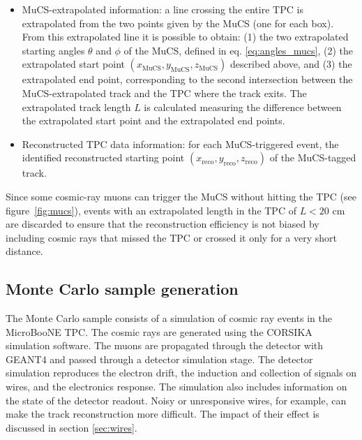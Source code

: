 \documentclass[a4paper,11pt]{article}
\begin{document}
\begin{itemize}
  \item MuCS-extrapolated information: a line crossing the entire TPC is extrapolated from the two points given by the MuCS (one for each box). From this extrapolated line it is possible to obtain: (1) the two extrapolated starting angles $\theta$ and $\phi$ of the MuCS, defined in eq. \eqref{eq:angles_mucs}, (2) the extrapolated start point $(x_{\mathrm{MuCS}},y_{\mathrm{MuCS}},z_{\mathrm{MuCS}})$ described above, and (3) the extrapolated end point, corresponding to the second intersection between the MuCS-extrapolated track and the TPC where the track exits. The extrapolated track length $L$ is calculated measuring the difference between the extrapolated start point and the extrapolated end points.
  \item Reconstructed TPC data information: for each MuCS-triggered event, the identified reconstructed starting point $(x_{\mathrm{reco}},y_{\mathrm{reco}},z_{\mathrm{reco}})$ of the MuCS-tagged track.
\end{itemize}

Since some cosmic-ray muons can trigger the MuCS without hitting the TPC (see figure~\ref{fig:mucs}), events with an extrapolated length in the TPC of $L < 20$ cm are discarded to ensure that the reconstruction efficiency is not biased by including cosmic rays that missed the TPC or crossed it only for a very short distance.

\subsection{Monte Carlo sample generation}\label{sec:mcgen}

The Monte Carlo sample consists of a simulation of cosmic ray events in the MicroBooNE TPC. The cosmic rays are generated using the CORSIKA \cite{corsika} simulation software. The muons are propagated through the detector with GEANT4 \cite{geant} and passed through a detector simulation stage. The detector simulation reproduces the electron drift, the induction and collection of signals on wires, and the electronics response. The simulation also includes information on the state of the detector readout. Noisy or unresponsive wires, for example, can make the track reconstruction more difficult. The impact of their effect is discussed in section \ref{sec:wires}.

\end{document}
